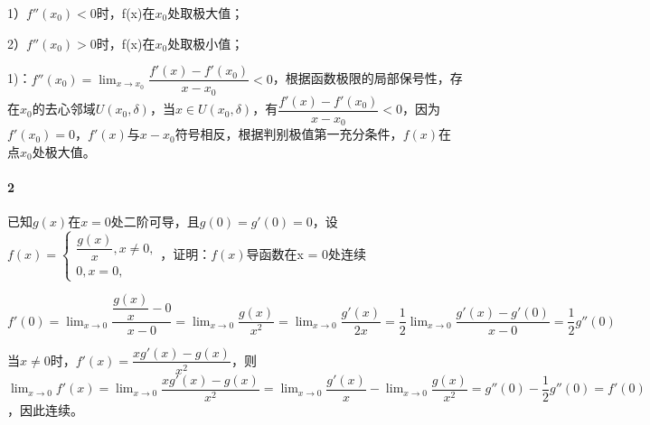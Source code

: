 1）\(f''(x_0) < 0\)时，f(x)在\(x_0\)处取极大值；

2）\(f''(x_0) > 0\)时，f(x)在\(x_0\)处取极小值；

1)：\(f''(x_0) = \displaystyle \lim_{x \to x_0}\dfrac{f'(x) - f'(x_0)}{x - x_0} < 0\)，根据函数极限的局部保号性，存在\(x_0\)的去心邻域\(U(x_0, \delta)\)，当\(x \in U(x_0, \delta)\)，有\(\dfrac{f'(x) - f'(x_0)}{x - x_0} < 0\)，因为\(f'(x_0) = 0\)，\(f'(x)\)与\(x - x_0\)符号相反，根据判别极值第一充分条件，\(f(x)\)在点\(x_0\)处极大值。

\paragraph{2}
已知\(g(x)\)在\(x = 0\)处二阶可导，且\(g(0) = g'(0) = 0\)，设\(f(x) = \begin{cases}
\dfrac{g(x)}{x}, x\neq 0, \\ 
0, x = 0,
\end{cases}\)，证明：\(f(x)\)导函数在x = 0处连续

\(f'(0) = \displaystyle \lim_{x \to 0}\dfrac{\dfrac{g(x)}{x} - 0}{x - 0} = \lim_{x \to 0}\dfrac{g(x)}{x^2} = \lim_{x \to 0}\dfrac{g'(x)}{2x} = \dfrac{1}{2}\lim_{x \to 0}\dfrac{g'(x) - g'(0)}{x - 0} = \dfrac{1}{2}g''(0)\)

当\(x \neq 0\)时，\(f'(x) = \dfrac{xg'(x) - g(x)}{x^2}\)，则\(\displaystyle\lim_{x \to 0}f'(x) = \lim_{x \to 0}\dfrac{xg'(x) - g(x)}{x^2} = \lim_{x \to 0}\dfrac{g'(x)}{x} - \lim_{x \to 0}\dfrac{g(x)}{x^2} = g''(0) - \dfrac{1}{2}g''(0) = f'(0)\)，因此连续。


